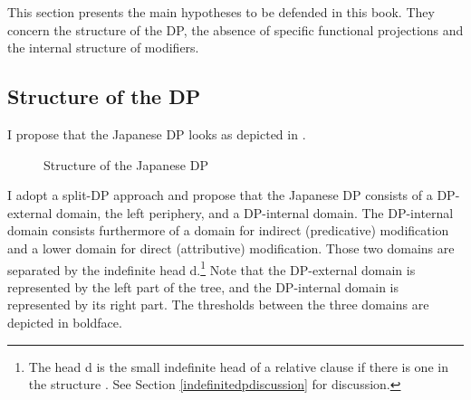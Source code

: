 This section presents the main hypotheses to be defended in this book. They concern the structure of the DP, the absence of specific functional projections and the internal structure of modifiers.

\subsection{Structure of the DP}

I propose that the Japanese DP looks as depicted in .


\begin{figure}

 \begin{subfigure}{0.45\textwidth}

 \small
 \end{subfigure}
 \begin{subfigure}{0.45\textwidth}

 \end{subfigure}
 \caption{Structure of the Japanese DP}
 \label{fig:Structure of the Japanese DP1}
\end{figure}


I adopt a split-DP approach \citep{laenzlinger:2005:french, laenzlinger:2011:elements, kim:2019:syntax} and propose that the Japanese DP consists of a DP-external domain, the left periphery, and a DP-internal domain. The DP-internal domain consists furthermore of a domain for indirect (predicative) modification and a lower domain for direct (attributive) modification. Those two domains are separated by the indefinite head d.\footnote{The head d is the small indefinite head of a relative clause if there is one in the structure \citep{cinque:2010:adj, cinque:2020:relcl}. See Section \ref{indefinitedpdiscussion} for discussion.} Note that the DP-external domain is represented by the left part of the tree, and the DP-internal domain is represented by its right part. The thresholds between the three domains are depicted in boldface.


